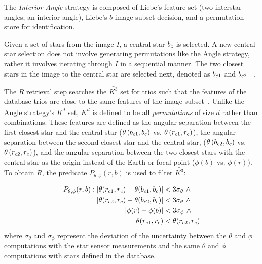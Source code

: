 The \textit{Interior Angle} strategy is composed of Liebe's feature set (two interstar angles, an interior angle),
Liebe's $b$ image subset decision, and a permutation store for identification.

Given a set of stars from the image $I$, a central star $b_c$ is selected.
A new central star selection does not involve generating permutations like the Angle strategy, rather it involves
iterating through $I$ in a sequential manner.
The two closest stars in the image to the central star are selected next, denoted as $b_{c1}$ and $b_{c2}$
~\cite{liebe:starTrackersAttitudeDetermination}.

The $R$ retrieval step searches the $\bar{K^3}$ set for trios such that the features of the database trios are
close to the same features of the image subset~\cite{bratt:analysisStarIdentification}.
Unlike the Angle strategy's $K^d$ set, $\bar{K^d}$ is defined to be all \textit{permutations} of size $d$ rather than
combinations.
These features are defined as the angular separation between the first closest star and the central star
($\theta\left(b_{c1}, b_c\right)$ vs. $ \theta\left(r_{c1}, r_c\right)$), the
angular separation between the second closest star and the central star, ($\theta\left(b_{c2},
b_c\right) $ vs. $\theta\left(r_{c2}, r_c\right)$),
and the angular separation between the two closest stars with the central star as the origin instead of the Earth or 
focal point ($\phi(b) $ vs. $ \phi(r)$).
To obtain $R$, the predicate $P_{\theta, \phi}(r, b)$ is used to filter $\bar{K^3}$:

\begin{equation}
    \begin{aligned}
        P_{\theta, \phi} (r, b): \left\lvert \theta(r_{c1}, r_c) - \theta(b_{c1}, b_c)\right\rvert
        &< 3 \sigma_{\theta} \ \land \\ \left\lvert \theta(r_{c2}, r_c) - \theta(b_{c2}, 
        b_c)\right\rvert &< 3 \sigma_{\theta} \ \land \\ \left\lvert \phi(r) - \phi(b)\right\rvert &< 3 
        \sigma_\phi \ \land \\\theta(r_{c1}, r_c) &< \theta(r_{c2}, r_c)
    \end{aligned}
\end{equation}
where $\sigma_{\theta}$ and $\sigma_{\phi}$ represent the deviation of the uncertainty between the $\theta$ and $\phi$
computations with the star sensor measurements and the same $\theta$ and $\phi$ computations with stars defined in the
database.

